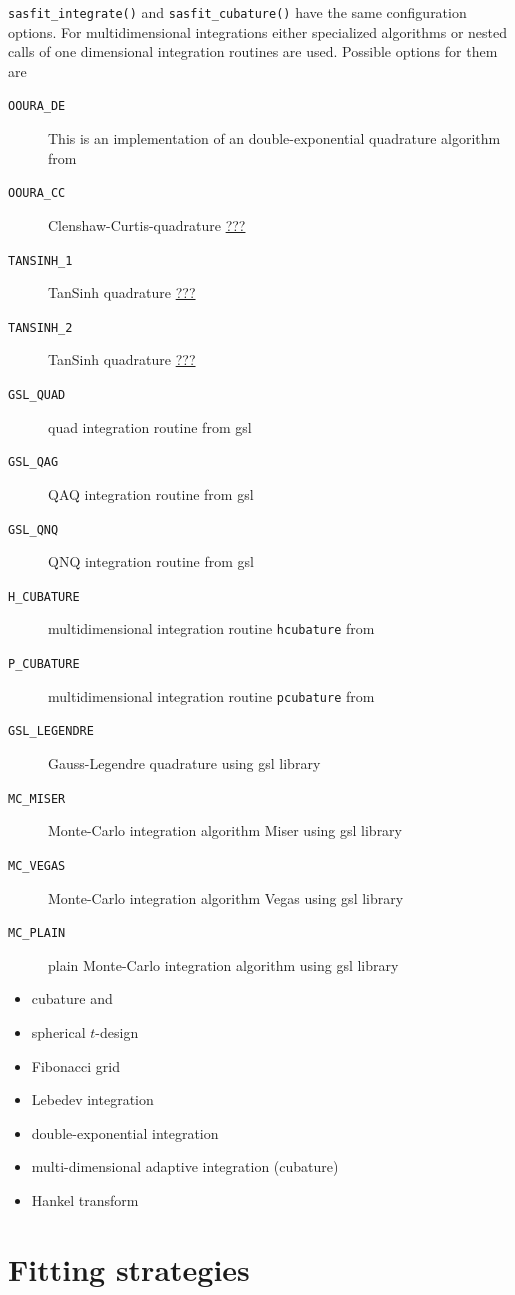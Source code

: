 \texttt{sasfit\_integrate()}  and \texttt{sasfit\_cubature()} have the same configuration options. For multidimensional integrations either specialized algorithms or nested calls of one dimensional integration routines are used. Possible options for them are
\begin{description}
   \item[\texttt{OOURA\_DE}] This is an implementation of an double-exponential quadrature algorithm from \cite{Mori1990,Mori2001}
   \item[\texttt{OOURA\_CC}] Clenshaw-Curtis-quadrature \url{???}
   \item[\texttt{TANSINH\_1}] TanSinh quadrature \url{???}
   \item[\texttt{TANSINH\_2}] TanSinh quadrature \url{???}
   \item[\texttt{GSL\_QUAD}] quad integration routine from gsl \cite{Galassi2021}
   \item[\texttt{GSL\_QAG}] QAQ integration routine from gsl \cite{Galassi2021}
   \item[\texttt{GSL\_QNQ}] QNQ integration routine from gsl \cite{Galassi2021}
   \item[\texttt{H\_CUBATURE}] multidimensional integration routine \texttt{hcubature} from \cite{Johnson2017}
   \item[\texttt{P\_CUBATURE}] multidimensional integration routine \texttt{pcubature} from \cite{Johnson2017}
   \item[\texttt{GSL\_LEGENDRE}] Gauss-Legendre quadrature using gsl library  \cite{Galassi2021}
   \item[\texttt{MC\_MISER}] Monte-Carlo integration algorithm Miser using gsl library  \cite{Galassi2021}
   \item[\texttt{MC\_VEGAS}]  Monte-Carlo integration algorithm Vegas using gsl library  \cite{Galassi2021}
   \item[\texttt{MC\_PLAIN}]  plain Monte-Carlo integration algorithm using gsl library  \cite{Galassi2021}
\end{description}

\begin{itemize}
  \item cubature \cite{Genz1980,Berntsen1991} and \cite{Clenshaw1960}
  \item spherical $t$-design \cite{Graef2011,Hardin1996}
  \item Fibonacci grid \cite{Swinbank2006,Marques_2013}
  \item Lebedev integration \cite{Lebedev1975,Lebedev1976,Lebedev1977}
  \item double-exponential integration \cite{Mori1990,Ooura_1991,Mori2001}
  \item multi-dimensional adaptive integration (cubature) \cite{Johnson2017,Galassi2021}
  \item Hankel transform \cite{Chave1983,Anderson1989,Ooura_1991,Guptasarma1997,Ogata2005,Kong2007,Key2012,Kang2021}
\end{itemize}

\clearpage
\section{Fitting strategies}
